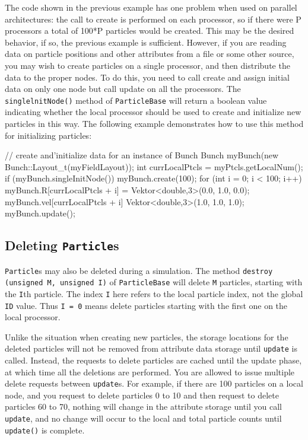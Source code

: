 The code shown in the previous example has one problem when used on parallel architectures: the call to create is performed on each processor, so if there were P processors a total of 100*P particles would be created. This may be the desired behavior, if so, the previous example is sufficient. However, if you are reading data on particle positions and other attributes from a file or some other source, you may wish to create particles on a single processor, and then distribute the
data to the proper nodes. To do this, you need to call create and assign initial data on only one node but call update on all the processors. The \texttt{singlelnitNode()} method of \texttt{ParticleBase} will return a boolean value indicating whether the local processor should be used to create and initialize new particles in this way. The following example demonstrates how to use this method for initializing particles: \\
\begin{code}
// create and'initialize data for an instance of Bunch 
Bunch myBunch(new Bunch::Layout\_t(myFieldLayout)); 
int currLocalPtcls = myPtcls.getLocalNum();
if (myBunch.singleInitNode()) { 
    myBunch.create(100);  
    for (int i = 0; i < 100; i++) { 
        myBunch.R[currLocalPtcls + i] = Vektor<double,3>(0.0, 1.0, 0.0); 
        myBunch.vel[currLocalPtcls + i] Vektor<double,3>(1.0, 1.0, 1.0); 
    }
} 
myBunch.update(); 
\end{code}


\subsection{Deleting \texttt{Particle}s}

\texttt{Particle}s may also be deleted during a simulation. The method \texttt{destroy (unsigned M, unsigned I)} of \texttt{ParticleBase} will delete \texttt{M} particles, starting with the \texttt{I}th particle. The index \texttt{I} here refers to the local particle index, not the global \texttt{ID} value. Thus \texttt{I = 0} means delete particles starting with the first one on the local processor.

Unlike the situation when creating new particles, the storage locations for the deleted particles will not be removed from attribute data storage until \texttt{update} is called. Instead, the requests to delete particles are cached until the update phase, at which time all the deletions are performed. You are allowed to issue multiple delete requests between \texttt{update}s. For example, if there are 100 particles on a local node, and you request to delete particles 0 to 10
and then request to delete particles 60 to 70, nothing will change in the attribute storage until you call \texttt{update}, and no change will occur to the local and total particle counts until \texttt{update()} is complete.

